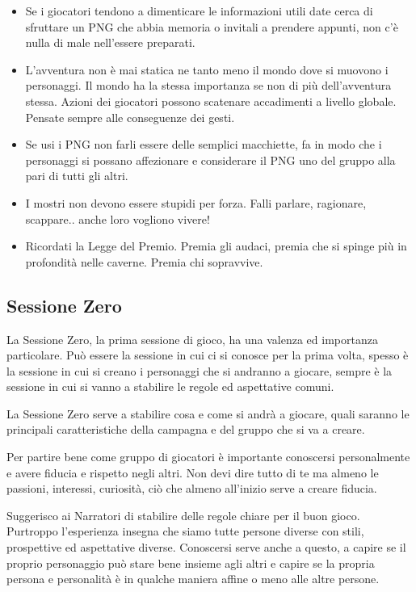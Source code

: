 \begin{multicols}{2}
\begin{itemize}[leftmargin=*]
\item
Se i giocatori tendono a dimenticare le informazioni utili date cerca di sfruttare un PNG che abbia memoria o invitali a prendere appunti, non c'è nulla di male nell'essere preparati.

\item
L'avventura non è mai statica ne tanto meno il mondo dove si muovono i personaggi.
Il mondo ha la stessa importanza se non di più dell'avventura stessa. Azioni dei giocatori possono scatenare accadimenti a livello globale. Pensate sempre alle conseguenze dei gesti.

\item
Se usi i PNG non farli essere delle semplici macchiette, fa in modo che i personaggi si possano affezionare e considerare il PNG uno del gruppo alla pari di tutti gli altri.

\item
I mostri non devono essere stupidi per forza. Falli parlare, ragionare, scappare.. anche loro vogliono vivere!

\item
Ricordati la Legge del Premio. Premia gli audaci, premia che si spinge più in profondità nelle caverne. Premia chi sopravvive.

\end{itemize}

\subsection{Sessione Zero}\label{sessionezero}\hypertarget{sessionezero}{}

La Sessione Zero, la prima sessione di gioco, ha una valenza ed importanza particolare. Può essere la sessione in cui ci si conosce per la prima volta, spesso è la sessione in cui si creano i personaggi che si andranno a giocare, sempre è la sessione in cui si vanno a stabilire le regole ed aspettative comuni.

La Sessione Zero serve a stabilire cosa e come si andrà a giocare, quali saranno le principali caratteristiche della campagna e del gruppo che si va a creare.

Per partire bene come gruppo di giocatori è importante conoscersi personalmente e avere fiducia e rispetto negli altri. Non devi dire tutto di te ma almeno le passioni, interessi, curiosità, ciò che almeno all'inizio serve a creare fiducia.

Suggerisco ai Narratori di stabilire delle regole chiare per il buon gioco. Purtroppo l'esperienza insegna che siamo tutte persone diverse con stili, prospettive ed aspettative diverse. Conoscersi serve anche a questo, a capire se il proprio personaggio può stare bene insieme agli altri e capire se la propria persona e personalità è in qualche maniera affine o meno alle altre persone.


\end{multicols}
